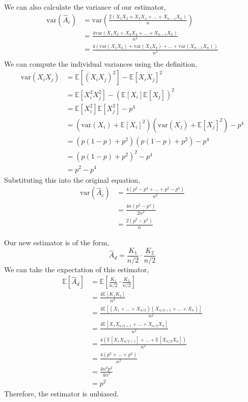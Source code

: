 \documentclass[12pt,twoside]{article}
\begin{document}
\begin{problems}
\begin{problemparts}
We can also calculate the variance of our estimator,
\begin{align*}
    \mathrm{var}(\hat{A}_c) &= \mathrm{var}\left(\frac{2\left(X_1 X_2 + X_3 
    X_4 + \ldots + X_{n - 1} X_n\right)}{n}\right) \\
    &= \frac{4 \mathrm{var}\left(X_1 X_2 + X_3 X_4 + \ldots + X_{n - 1} 
    X_n\right)}{n^2} \\
    &= \frac{4 \left(\mathrm{var}(X_1 X_2) + \mathrm{var}(X_3 X_4) + \ldots 
    + \mathrm{var}(X_{n - 1} X_n)\right)}{n^2} \\
\end{align*}
We can compute the individual variances using the definition,
\begin{align*}
    \mathrm{var}(X_i X_j) &= \mathbb{E}[(X_i X_j)^2] - \mathbb{E}[X_i X_j]^2 \\
    &= \mathbb{E}[X_i^2 X_j^2] - \left(\mathbb{E}[X_i] \mathbb{E}[X_j]\right)^2 \\
    &= \mathbb{E}[X_i^2] \mathbb{E}[X_j^2] - p^4 \\
    &= \left(\mathrm{var}(X_i) + \mathbb{E}[X_i]^2\right) \left(\mathrm{var}(X_j) 
    + \mathbb{E}[X_j]^2\right) - p^4 \\
    &= \left(p(1 - p) + p^2\right) \left(p(1 - p) + p^2\right) - p^4 \\
    &= \left(p(1 - p) + p^2\right)^2 - p^4 \\
    &= p^2 - p^4
\end{align*}
Substituting this into the original equation,
\begin{align*}
    \mathrm{var}(\hat{A}_c) &= \frac{4 \left(p^2 - p^4 + \ldots + p^2 - p^4\right)}{n^2} \\
    &= \frac{4n\left(p^2 - p^4\right)}{2 n^2} \\
    &= \boxed{\frac{2 \left(p^2 - p^4\right)}{n}}
\end{align*}

\problempart %

Our new estimator is of the form,
$$ \hat{A}_d = \frac{K_1}{n / 2} \cdot \frac{K_2}{n / 2} $$
We can take the expectation of this estimator,
\begin{align*}
    \mathbb{E}[\hat{A}_d] &= \mathbb{E}\left[\frac{K_1}{n / 2} \cdot \frac{K_2}{n / 2}
    \right] \\
    &= \frac{4 \mathbb{E}[K_1 K_2]}{n^2} \\
    &= \frac{4 \mathbb{E}[\left(X_1 + \ldots + X_{n / 2}\right) \left(X_{n / 2 + 1} + 
    \ldots + X_n\right)]}{n^2} \\
    &= \frac{4 \mathbb{E}[X_1 X_{n / 2 + 1} + \ldots + X_{n / 2} X_n]}{n^2} \\
    &= \frac{4 \left(\mathbb{E}[X_1 X_{n / 2 + 1}] + \ldots + \mathbb{E}[X_{n / 2} 
    X_n]\right)}{n^2} \\
    &= \frac{4 \left( p^2 + \ldots + p^2 \right)}{n^2} \\
    &= \frac{4 n^2 p^2}{4 n^2} \\
    &= \boxed{p^2}
\end{align*}
Therefore, the estimator is unbiased.


\end{problemparts}
\end{problems}
\end{document}

